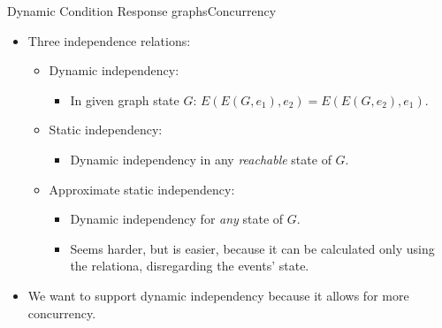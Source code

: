 \documentclass{beamer}
\begin{document}
\begin{frame}{Dynamic Condition Response graphs}{Concurrency}
	\begin{itemize}
  	\item Three independence relations:
  	\begin{itemize}
  		\item Dynamic independency:
  		\begin{itemize}
  			\item In given graph state $G$: $E(E(G, e_1),e_2)=E(E(G, e_2),e_1)$.
  		\end{itemize}

			\vfill

  		\item Static independency:
  		\begin{itemize}
  			\item Dynamic independency in any \textit{reachable} state of $G$.
  		\end{itemize}

			\vfill

			\item Approximate static independency:
			\begin{itemize}
			 	\item Dynamic independency for \textit{any} state of $G$.
			 	\item Seems harder, but is easier, because it can be calculated only using the relationa, disregarding the events' state.
			\end{itemize} 
  	\end{itemize}

			\vfill

		\item We want to support dynamic independency because it allows for more concurrency.
  \end{itemize}
\end{frame}
\end{document}
